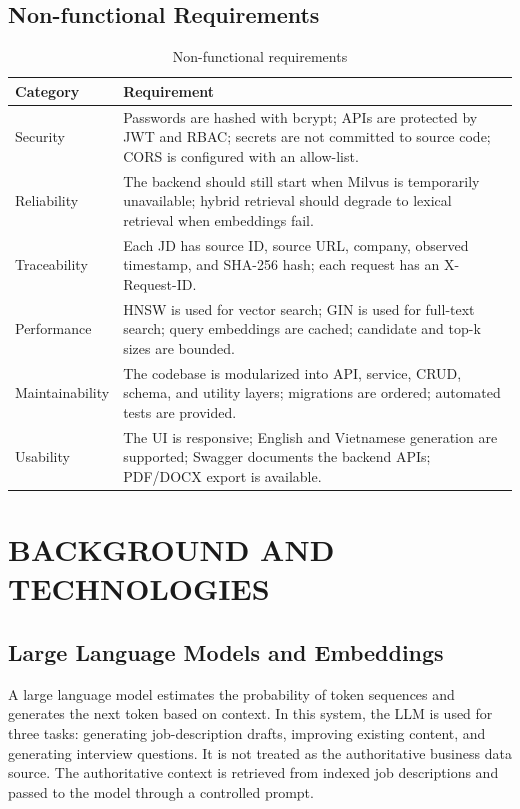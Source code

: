 \documentclass[12pt,a4paper,oneside]{report}
\begin{document}
\section{Non-functional Requirements}
\begin{table}[H]
\centering
\caption{Non-functional requirements}
\label{tab:nonfunctional}
\begin{tabularx}{\textwidth}{p{2.8cm}X}
\toprule
\textbf{Category} & \textbf{Requirement}\\
\midrule
Security & Passwords are hashed with bcrypt; APIs are protected by JWT and RBAC; secrets are not committed to source code; CORS is configured with an allow-list.\\
Reliability & The backend should still start when Milvus is temporarily unavailable; hybrid retrieval should degrade to lexical retrieval when embeddings fail.\\
Traceability & Each JD has source ID, source URL, company, observed timestamp, and SHA-256 hash; each request has an X-Request-ID.\\
Performance & HNSW is used for vector search; GIN is used for full-text search; query embeddings are cached; candidate and top-k sizes are bounded.\\
Maintainability & The codebase is modularized into API, service, CRUD, schema, and utility layers; migrations are ordered; automated tests are provided.\\
Usability & The UI is responsive; English and Vietnamese generation are supported; Swagger documents the backend APIs; PDF/DOCX export is available.\\
\bottomrule
\end{tabularx}
\end{table}

\chapter{BACKGROUND AND TECHNOLOGIES}

\section{Large Language Models and Embeddings}
A large language model estimates the probability of token sequences and generates the next token based on context. In this system, the LLM is used for three tasks: generating job-description drafts, improving existing content, and generating interview questions. It is not treated as the authoritative business data source. The authoritative context is retrieved from indexed job descriptions and passed to the model through a controlled prompt.
\end{document}
